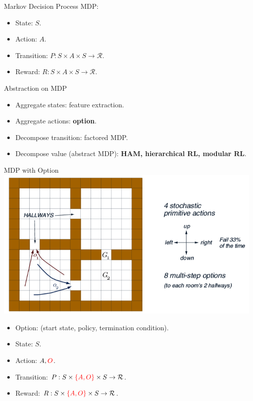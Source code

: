 Markov Decision Process
MDP:
\begin{itemize}
\item State: $S$.
\item Action: $A$.
\item Transition: $P: S \times A \times S \rightarrow \mathcal{R}$.
\item Reward: $R: S \times A \times S \rightarrow \mathcal{R}$.
\end{itemize}



Abstraction on MDP
\begin{itemize}
  \item Aggregate states: feature extraction. 
  \item Aggregate actions: {\bf option}. 
  \item Decompose transition: factored MDP. 
  \item Decompose value (abstract MDP): {\bf HAM, hierarchical RL, modular RL}.
\end{itemize}



MDP with Option
\includegraphics[width=0.8\columnwidth]{option.png}
\begin{itemize}
  \item Option: (start state, policy, termination condition).
\end{itemize}



\begin{itemize}
  \item State: $S$.
  \item Action: $A, {\color{red}O}$.
  \item Transition: $P: S \times {\color{red}\{A, O\}} \times S \rightarrow \mathcal{R}$.
  \item Reward: $R: S \times {\color{red}\{A, O\}} \times S \rightarrow \mathcal{R}$.
\end{itemize}




